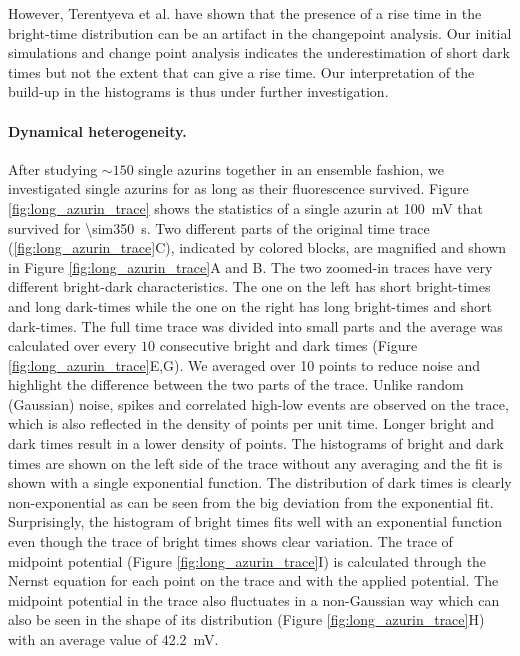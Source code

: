 However, Terentyeva et al. have shown that the presence of a rise time in the bright-time distribution can be an artifact in the changepoint analysis.
Our initial simulations and change point analysis indicates the underestimation of short dark times but not the extent that can give a rise time.
Our interpretation of the build-up in the histograms is thus under further investigation.
\paragraph*{Dynamical heterogeneity.}
After studying ${\sim}150$ single azurins together in an ensemble fashion, we investigated single azurins for as long as their fluorescence survived.
Figure \ref{fig:long_azurin_trace} shows the statistics of a single azurin at \SI{100}{\mV} that survived for \SI{\sim350}{\s}.
Two different parts of the original time trace (\ref{fig:long_azurin_trace}C), indicated by colored blocks, are magnified and shown in Figure \ref{fig:long_azurin_trace}A and B.
The two zoomed-in traces have very different bright-dark characteristics.
The one on the left has short bright-times and long dark-times while the one on the right has long bright-times and short dark-times.
The full time trace was divided into small parts and the average was calculated over every $10$ consecutive bright and dark times (Figure \ref{fig:long_azurin_trace}E,G).
We averaged over 10 points to reduce noise and highlight the difference between the two parts of the trace.
Unlike random (Gaussian) noise, spikes and correlated high-low events are observed on the trace, which is also reflected in the density of points per unit time.
Longer bright and dark times result in a lower density of points.
The histograms of bright and dark times are shown on the left side of the trace without any averaging and the fit is shown with a single exponential function.
The distribution of dark times is clearly non-exponential as can be seen from the big deviation from the exponential fit.
Surprisingly, the histogram of bright times fits well with an exponential function even though the trace of bright times shows clear variation. 
The trace of midpoint potential (Figure \ref{fig:long_azurin_trace}I) is calculated through the Nernst equation for each point on the trace and with the applied potential.
The midpoint potential in the trace also fluctuates in a non-Gaussian way which can also be seen in the shape of its distribution (Figure \ref{fig:long_azurin_trace}H) with an average value of \SI{42.2}{\mV}.
